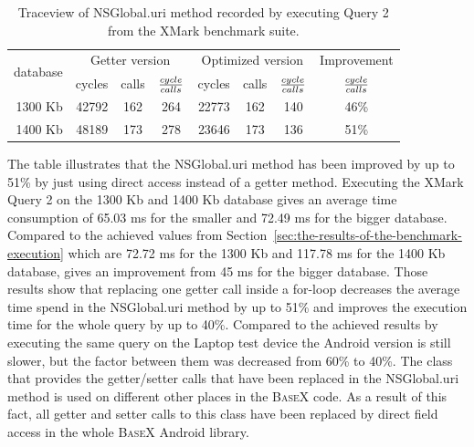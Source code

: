 \begin {table}[htpb] 
  \begin{center}
\begin {tabular} {|r|r|c|c|r|c|c||c|}
  	\hline
	\multirow{2}{*}{database}&\multicolumn{3}{c}{Getter version}&\multicolumn{3}{|c||}{Optimized version}&Improvement\\
	\cline{2-8}
	&cycles&calls&${cycle \over calls}$&cycles&calls&${cycle \over calls}$&${cycle \over calls}$\\
	\hline
	\hline
	1300 Kb&42792&162&264&22773&162&140&46\%\\
	\hline
	1400 Kb&48189&173&278&23646&173&136&51\%\\
	\hline
\end {tabular}
\caption {Traceview of \textsf{NSGlobal.uri} method recorded by executing Query 2 from the XMark benchmark suite.}
\label {tab:traceview-q2-optimized}
\end{center}
\end {table}
The table illustrates that the \textsf{NSGlobal.uri} method has been improved by up to 51\% by just using direct access instead of a getter method.
Executing the XMark Query 2 on the 1300 Kb and 1400 Kb database gives an average time consumption of 65.03 ms for the smaller and 72.49 ms for the bigger database.
Compared to the achieved values from Section~\ref{sec:the-results-of-the-benchmark-execution} which are 72.72 ms for the 1300 Kb and 117.78 ms for the 1400 Kb database, gives an improvement from 45 ms for the bigger database.
Those results show that replacing one getter call inside a for-loop decreases the average time spend in the \textsf{NSGlobal.uri} method by up to 51\% and improves the execution time  for the whole query by up to 40\%.
Compared to the achieved results by executing the same query on the Laptop test device the Android version is still slower, but the factor between them was decreased from 60\% to 40\%.
The class that provides the getter/setter calls that have been replaced in the \textsf{NSGlobal.uri} method is used on different other places in the \textsc{BaseX} code.
As a result of this fact, all getter and setter calls to this class have been replaced by direct field access in the whole \textsc{BaseX} Android library.\\


